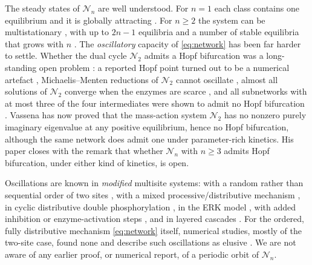 \documentclass[11pt,a4paper]{article}
\theoremstyle{plain}
\theoremstyle{definition}
\theoremstyle{remark}
\newcommand{\cN}{\mathcal N}
\begin{document}
The steady states of $\cN_n$ are well understood. For $n=1$ each class contains one equilibrium and it is globally attracting \cite{AngeliSontag08}. For $n\ge2$ the system can be multistationary \cite{Markevich04,WangSontag08a,ConradiMincheva14,HellRendall15}, with up to $2n-1$ equilibria \cite{WangSontag08a,Flockerzi14} and a number of stable equilibria that grows with $n$ \cite{ThomsonGunawardena09,FeliuRendallWiuf20}. The \emph{oscillatory} capacity of \eqref{eq:network} has been far harder to settle. Whether the dual cycle $\cN_2$ admits a Hopf bifurcation was a long-standing open problem \cite{ConradiShiu18,ConradiMinchevaShiu19,ConradiFeliuMincheva20,FeliuKaihnsa26}: a reported Hopf point \cite{Errami15} turned out to be a numerical artefact \cite{ConradiFeliuMincheva20}, Michaelis--Menten reductions of $\cN_2$ cannot oscillate \cite{BozemanMorales17,Tung18}, almost all solutions of $\cN_2$ converge when the enzymes are scarce \cite{WangSontag08b}, and all subnetworks with at most three of the four intermediates were shown to admit no Hopf bifurcation \cite{ConradiFeliuMincheva20,FeliuKaihnsa26}. Vassena \cite{Vassena26} has now proved that the mass-action system $\cN_2$ has no nonzero purely imaginary eigenvalue at any positive equilibrium, hence no Hopf bifurcation, although the same network does admit one under parameter-rich kinetics. His paper closes with the remark that whether $\cN_n$ with $n\ge3$ admits Hopf bifurcation, under either kind of kinetics, is open.

Oscillations are known in \emph{modified} multisite systems: with a random rather than sequential order of two sites \cite{Jolley12}, with a mixed processive/distributive mechanism \cite{SuwanmajoKrishnan15,ConradiMinchevaShiu19}, in cyclic distributive double phosphorylation \cite{Suwanmajo20,ConradiMincheva24}, in the ERK model \cite{Rubinstein16,Obatake19}, with added inhibition or enzyme-activation steps \cite{Chickarmane07,SuwanmajoKrishnan18,Ramesh23}, and in layered cascades \cite{HellRendall16}. For the ordered, fully distributive mechanism \eqref{eq:network} itself, numerical studies, mostly of the two-site case, found none and describe such oscillations as elusive \cite{SuwanmajoKrishnan15,SuwanmajoKrishnan18,Suwanmajo20}. We are not aware of any earlier proof, or numerical report, of a periodic orbit of $\cN_n$.
\end{document}
